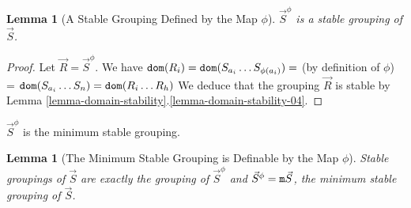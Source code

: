 \documentclass{lmcs}
\newtheorem{lemma}[theorem]{Lemma}
\begin{document}
\begin{lemma} [A Stable Grouping Defined by the Map $\phi$]
\label{lemma-stable-phi-1}
$\vec{S}^\phi$ is a stable grouping of $\vec{S}$.
\end{lemma}

\begin{proof}
Let $\vec{R} = \vec{S}^\phi$. We have
$
{\tt dom}(R_i) = 
{\tt dom}(S_{a_i}\ldots S_{\phi(a_i)}) = 
$ 
(by definition of $\phi$)  = 
$
{\tt dom}(S_{a_i}\ldots S_{n}) =
{\tt dom}(R_{i}\ldots R_h)
$
We deduce that the grouping $\vec{R}$ is stable by 
Lemma \ref{lemma-domain-stability}.\ref{lemma-domain-stability-04}.
\end{proof}

$\vec{S}^\phi$ is the minimum stable grouping.

\begin{lemma} [The Minimum Stable Grouping is Definable by the Map $\phi$]
\label{lemma-stable-phi-2}
Stable groupings of $\vec{S}$ are exactly the grouping of $\vec{S}^\phi$
and $\vec{S}^\phi={\tt m}{\vec{S}}$, the minimum stable grouping of $\vec{S}$.
\end{lemma}
\end{document}
